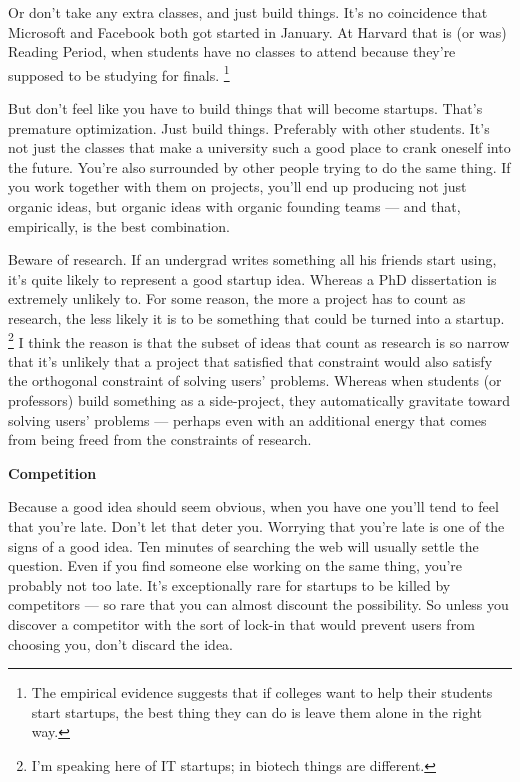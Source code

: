 \documentclass[12pt]{book}
\begin{document}
Or don't take any extra classes, and just build things. It's no
coincidence that Microsoft and Facebook both got started in January. At
Harvard that is (or was) Reading Period, when students have no classes
to attend because they're supposed to be studying for finals.
\footnote{The empirical evidence suggests that if colleges want to help
their students start startups, the best thing they can do is leave them
alone in the right way.}

But don't feel like you have to build things that will become startups.
That's premature optimization. Just build things. Preferably with other
students. It's not just the classes that make a university such a good
place to crank oneself into the future. You're also surrounded by other
people trying to do the same thing. If you work together with them on
projects, you'll end up producing not just organic ideas, but organic
ideas with organic founding teams --- and that, empirically, is the best
combination.

Beware of research. If an undergrad writes something all his friends
start using, it's quite likely to represent a good startup idea. Whereas
a PhD dissertation is extremely unlikely to. For some reason, the more a
project has to count as research, the less likely it is to be something
that could be turned into a startup. \footnote{I'm speaking here of IT startups; in biotech things are
different.} I think
the reason is that the subset of ideas that count as research is so
narrow that it's unlikely that a project that satisfied that constraint
would also satisfy the orthogonal constraint of solving users' problems.
Whereas when students (or professors) build something as a side-project,
they automatically gravitate toward solving users' problems --- perhaps
even with an additional energy that comes from being freed from the
constraints of research.

\textbf{Competition}

Because a good idea should seem obvious, when you have one you'll tend
to feel that you're late. Don't let that deter you. Worrying that you're
late is one of the signs of a good idea. Ten minutes of searching the
web will usually settle the question. Even if you find someone else
working on the same thing, you're probably not too late. It's
exceptionally rare for startups to be killed by competitors --- so rare
that you can almost discount the possibility. So unless you discover a
competitor with the sort of lock-in that would prevent users from
choosing you, don't discard the idea.
\end{document}
